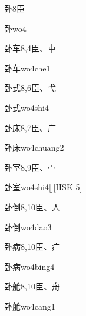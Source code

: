 \begin{entry}{卧}{8}{⾂}
  \begin{phonetics}{卧}{wo4}
  \end{phonetics}
\end{entry}

\begin{entry}{卧车}{8,4}{⾂、⾞}
  \begin{phonetics}{卧车}{wo4che1}
  \end{phonetics}
\end{entry}

\begin{entry}{卧式}{8,6}{⾂、⼷}
  \begin{phonetics}{卧式}{wo4shi4}
  \end{phonetics}
\end{entry}

\begin{entry}{卧床}{8,7}{⾂、⼴}
  \begin{phonetics}{卧床}{wo4chuang2}
  \end{phonetics}
\end{entry}

\begin{entry}{卧室}{8,9}{⾂、⼧}
  \begin{phonetics}{卧室}{wo4shi4}[][HSK 5]
  \end{phonetics}
\end{entry}

\begin{entry}{卧倒}{8,10}{⾂、⼈}
  \begin{phonetics}{卧倒}{wo4dao3}
  \end{phonetics}
\end{entry}

\begin{entry}{卧病}{8,10}{⾂、⽧}
  \begin{phonetics}{卧病}{wo4bing4}
  \end{phonetics}
\end{entry}

\begin{entry}{卧舱}{8,10}{⾂、⾈}
  \begin{phonetics}{卧舱}{wo4cang1}
  \end{phonetics}
\end{entry}

